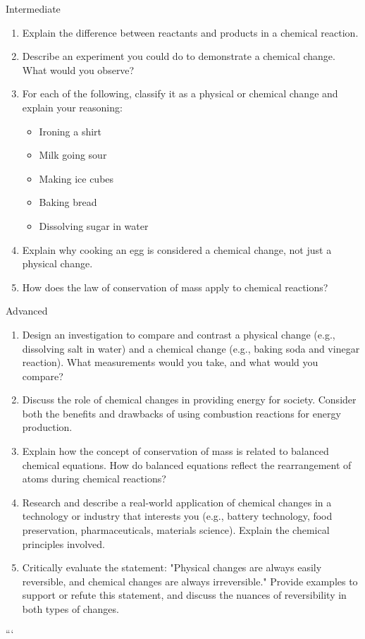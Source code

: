 \begin{tieredquestions}{Intermediate}
\begin{enumerate}
    \item  Explain the difference between reactants and products in a chemical reaction.
    \item  Describe an experiment you could do to demonstrate a chemical change. What would you observe?
    \item  For each of the following, classify it as a physical or chemical change and explain your reasoning:
        \begin{itemize}
            \item  Ironing a shirt
            \item  Milk going sour
            \item  Making ice cubes
            \item  Baking bread
            \item  Dissolving sugar in water
        \end{itemize}
    \item  Explain why cooking an egg is considered a chemical change, not just a physical change.
    \item  How does the law of conservation of mass apply to chemical reactions?
\end{enumerate}
\end{tieredquestions}

\begin{tieredquestions}{Advanced}
\begin{enumerate}
    \item  Design an investigation to compare and contrast a physical change (e.g., dissolving salt in water) and a chemical change (e.g., baking soda and vinegar reaction). What measurements would you take, and what would you compare?
    \item  Discuss the role of chemical changes in providing energy for society. Consider both the benefits and drawbacks of using combustion reactions for energy production.
    \item  Explain how the concept of conservation of mass is related to balanced chemical equations. How do balanced equations reflect the rearrangement of atoms during chemical reactions? 
    \item  Research and describe a real-world application of chemical changes in a technology or industry that interests you (e.g., battery technology, food preservation, pharmaceuticals, materials science). Explain the chemical principles involved. 
    \item  Critically evaluate the statement: "Physical changes are always easily reversible, and chemical changes are always irreversible." Provide examples to support or refute this statement, and discuss the nuances of reversibility in both types of changes.
\end{enumerate}
\end{tieredquestions}
```
\FloatBarrier
